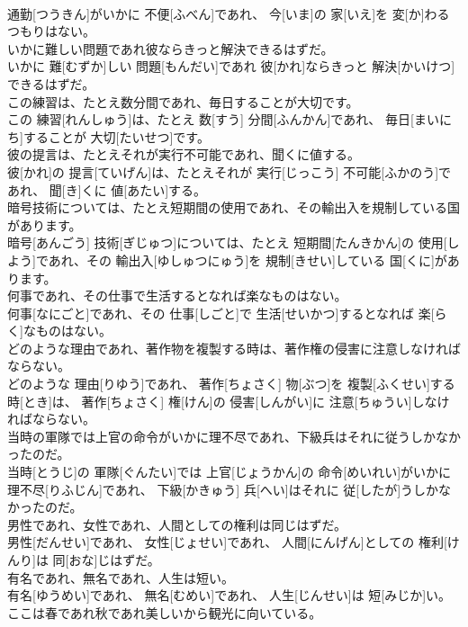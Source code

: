 \documentclass[8pt]{extreport}
\begin{document}
\begin{CJK}{UTF8}{min}
\\	通勤[つうきん]がいかに 不便[ふべん]であれ、 今[いま]の 家[いえ]を 変[か]わるつもりはない。
\\	いかに難しい問題であれ彼ならきっと解決できるはずだ。	
\\	いかに 難[むずか]しい 問題[もんだい]であれ 彼[かれ]ならきっと 解決[かいけつ]できるはずだ。
\\	この練習は、たとえ数分間であれ、毎日することが大切です。	
\\	この 練習[れんしゅう]は、たとえ 数[すう] 分間[ふんかん]であれ、 毎日[まいにち]することが 大切[たいせつ]です。
\\	彼の提言は、たとえそれが実行不可能であれ、聞くに値する。	
\\	彼[かれ]の 提言[ていげん]は、たとえそれが 実行[じっこう] 不可能[ふかのう]であれ、 聞[き]くに 値[あたい]する。
\\	暗号技術については、たとえ短期間の使用であれ、その輸出入を規制している国があります。	
\\	暗号[あんごう] 技術[ぎじゅつ]については、たとえ 短期間[たんきかん]の 使用[しよう]であれ、その 輸出入[ゆしゅつにゅう]を 規制[きせい]している 国[くに]があります。
\\	何事であれ、その仕事で生活するとなれば楽なものはない。	
\\	何事[なにごと]であれ、その 仕事[しごと]で 生活[せいかつ]するとなれば 楽[らく]なものはない。
\\	どのような理由であれ、著作物を複製する時は、著作権の侵害に注意しなければならない。	
\\	どのような 理由[りゆう]であれ、 著作[ちょさく] 物[ぶつ]を 複製[ふくせい]する 時[とき]は、 著作[ちょさく] 権[けん]の 侵害[しんがい]に 注意[ちゅうい]しなければならない。
\\	当時の軍隊では上官の命令がいかに理不尽であれ、下級兵はそれに従うしかなかったのだ。	
\\	当時[とうじ]の 軍隊[ぐんたい]では 上官[じょうかん]の 命令[めいれい]がいかに 理不尽[りふじん]であれ、 下級[かきゅう] 兵[へい]はそれに 従[したが]うしかなかったのだ。
\\	男性であれ、女性であれ、人間としての権利は同じはずだ。	
\\	男性[だんせい]であれ、 女性[じょせい]であれ、 人間[にんげん]としての 権利[けんり]は 同[おな]じはずだ。
\\	有名であれ、無名であれ、人生は短い。	
\\	有名[ゆうめい]であれ、 無名[むめい]であれ、 人生[じんせい]は 短[みじか]い。
\\	ここは春であれ秋であれ美しいから観光に向いている。	

\end{CJK}
\end{document}

